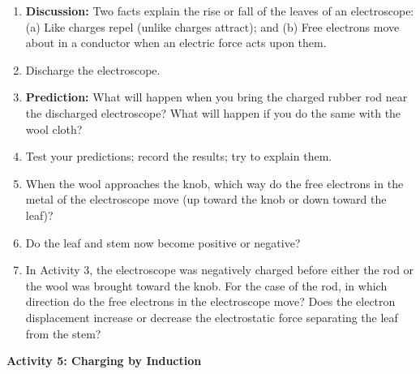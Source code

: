 \begin{enumerate}
\item \textbf{Discussion:} Two facts explain the rise or fall of the leaves
of an electroscope: (a) Like charges repel (unlike charges attract);
and (b) Free electrons move about in a conductor when an electric
force acts upon them.
\item Discharge the electroscope.
\item \textbf{Prediction:} What will happen when you bring the charged rubber
rod near the discharged electroscope? What will happen if you do the
same with the wool cloth?\vspace{15mm}

\item Test your predictions; record the results; try to explain them.\vspace{15mm}

\item When the wool approaches the knob, which way do the free electrons
in the metal of the electroscope move (up toward the knob or down
toward the leaf)?\vspace{15mm}

\item Do the leaf and stem now become positive or negative?\vspace{15mm}

\item In Activity 3, the electroscope was negatively charged before either
the rod or the wool was brought toward the knob. For the case of the
rod, in which direction do the free electrons in the electroscope
move? Does the electron displacement increase or decrease the electrostatic
force separating the leaf from the stem?\vspace{15mm}

\end{enumerate}
\textbf{Activity 5: Charging by Induction}

